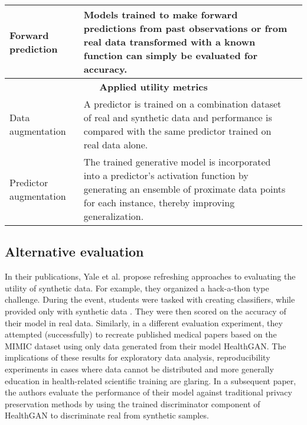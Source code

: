 \begin{table}[H]
\begin{tabularx}{\textwidth}{@{} p{} X p{} @{}}
        Forward prediction & Models trained to make forward predictions from past observations or from real data transformed with a known function can simply be evaluated for accuracy. & \cite{Xiao2018-aj,mcdermott2018semi,yoon2018imputation,Yang_2019_cdss}\\ \midrule

        \multicolumn{3}{c}{\textbf{Applied utility metrics}}\\ \midrule
        
        Data augmentation & A predictor is trained on a combination dataset of real and synthetic data and performance is compared with the same predictor trained on real data alone. & \cite{Yoon2020-anon, Yang_2019_cdss}\\
        
        Predictor augmentation & The trained generative model is incorporated into a predictor's activation function by generating an ensemble of proximate data points for each instance, thereby improving generalization. & \cite{Che_2017}\\
        
        \bottomrule
        
        \end{tabularx}
\end{table}

\subsection{Alternative evaluation}
In their publications, Yale et al. propose refreshing approaches to evaluating the utility of synthetic data. For example, they organized a hack-a-thon type challenge. During the event, students were tasked with creating classifiers, while provided only with synthetic data \cite{Yale_2020}. They were then scored on the accuracy of their model in real data. Similarly, in a different evaluation experiment, they attempted (successfully) to recreate published medical papers based on the MIMIC dataset using only data generated from their model HealthGAN. The implications of these results for exploratory data analysis, reproducibility experiments in cases where data cannot be distributed and more generally education in health-related scientific training are glaring. In a subsequent paper, the authors evaluate the performance of their model against traditional privacy preservation methods by using the trained discriminator component of HealthGAN to discriminate real from synthetic samples.
        

